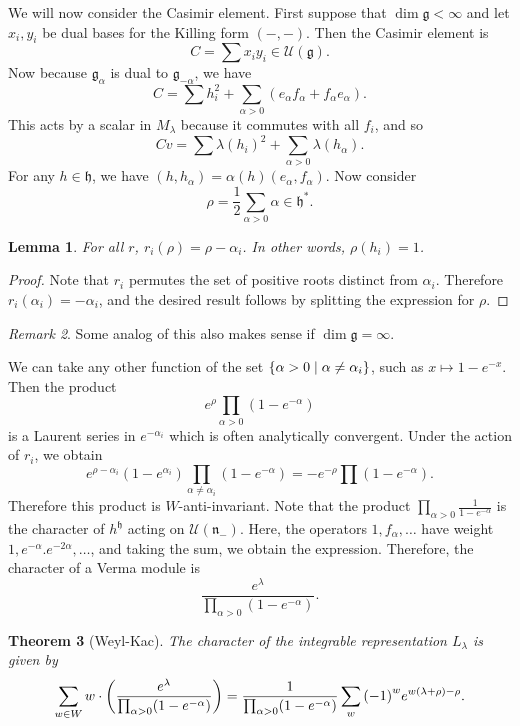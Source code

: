 \documentclass[leqno, openany]{memoir}
\newtheorem{thm}{Theorem}[section]
\newtheorem{lem}[thm]{Lemma}
\theoremstyle{definition}
\theoremstyle{remark}
\newtheorem{rmk}[thm]{Remark}
\theoremstyle{plain}
\theoremstyle{definition}
\theoremstyle{remark}
\newcommand{\mc}[1]{\mathcal{#1}}
\newcommand{\mf}[1]{\mathfrak{#1}}
\begin{document}
We will now consider the Casimir element. First suppose that $\dim \mf{g} < \infty$ and let $x_i, y_i$ be dual bases for the Killing form $(-,-)$. Then the Casimir element is
\[ C = \sum x_i y_i \in \mc{U}(\mf{g}). \]
Now because $\mf{g}_{\alpha}$ is dual to $\mf{g}_{-\alpha}$, we have
\[ C = \sum h_i^2 + \sum_{\alpha > 0} (e_{\alpha} f_{\alpha} + f_{\alpha} e_{\alpha}). \]
This acts by a scalar in $M_{\lambda}$ because it commutes with all $f_i$, and so 
\[ C v = \sum { \lambda(h_i) }^2 + \sum_{\alpha > 0} \lambda(h_{\alpha}). \]
For any $h \in \mf{h}$, we have $(h, h_{\alpha}) = \alpha(h) (e_{\alpha}, f_{\alpha})$. Now consider
\[ \rho = \frac{1}{2} \sum_{\alpha >0} \alpha \in \mf{h}^*. \]

\begin{lem}
    For all $r$, $r_i(\rho) = \rho - \alpha_i$. In other words, $\rho(h_i) = 1$.
\end{lem}

\begin{proof}
    Note that $r_i$ permutes the set of positive roots distinct from $\alpha_i$. Therefore $r_i(\alpha_i) = -\alpha_i$, and the desired result follows by splitting the expression for $\rho$.
\end{proof}

\begin{rmk}
    Some analog of this also makes sense if $\dim \mf{g} = \infty$.
\end{rmk}

We can take any other function of the set $\qty{\alpha > 0 \mid \alpha \neq \alpha_i}$, such as $x \mapsto 1-e^{-x}$. Then the product 
\[ e^{\rho} \prod_{\alpha > 0} (1-e^{-\alpha}) \]
is a Laurent series in $e^{-\alpha_i}$ which is often analytically convergent. Under the action of $r_i$, we obtain
\[ e^{\rho-\alpha_i} (1-e^{\alpha_i}) \prod_{\alpha \neq \alpha_i} (1-e^{-\alpha}) = -e^{-\rho} \prod (1-e^{-\alpha}). \]
Therefore this product is $W$-anti-invariant. Note that the product $\prod_{\alpha >0} \frac{1}{1-e^{-\alpha}}$ is the character of $h^{\mf{h}}$ acting on $\mc{U}(\mf{n}_-)$. Here, the operators $1, f_{\alpha}, \ldots$ have weight $1,e^{-\alpha}. e^{-2\alpha},\ldots$, and taking the sum, we obtain the expression. Therefore, the character of a Verma module is
\[ \frac{e^{\lambda}}{\prod_{\alpha > 0} (1-e^{-\alpha})}. \]

\begin{thm}[Weyl-Kac]
    The character of the integrable representation $L_{\lambda}$ is given by
    \[ \sum_{w \in W} w \cdot \qty(\frac{e^{\lambda}}{\prod_{\alpha > 0} (1-e^{-\alpha})}) = \frac{1}{\prod_{\alpha > 0}(1-e^{-\alpha})} \sum_w {(-1)}^w e^{w(\lambda + \rho) - \rho}. \]
\end{thm}
\end{document}
